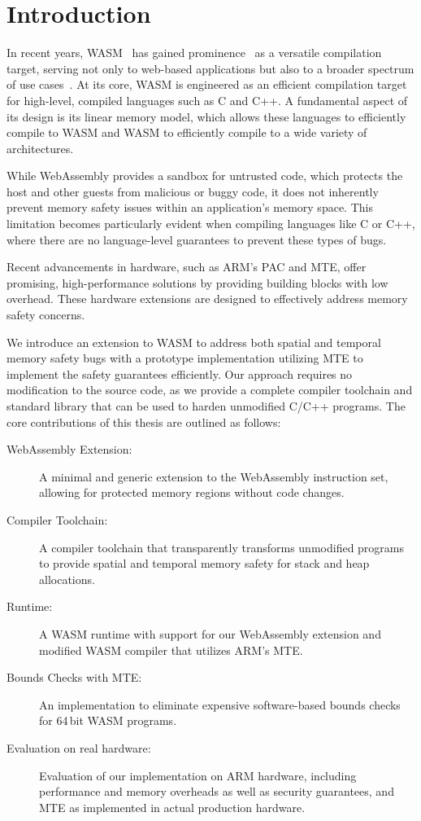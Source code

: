 \chapter{Introduction}
\label{ch:intro}

In recent years, \ac{WASM}~\cite{haas2017bringing} has gained prominence~\cite{musch2019new} as a versatile compilation target, serving not only to web-based applications but also to a broader spectrum of use cases~\cite{wasm_use_cases}.
At its core, \ac{WASM} is engineered as an efficient compilation target for high-level, compiled languages such as C and C++.
A fundamental aspect of its design is its linear memory model, which allows these languages to efficiently compile to \ac{WASM} and \ac{WASM} to efficiently compile to a wide variety of architectures.

While WebAssembly provides a sandbox for untrusted code, which protects the host and other guests from malicious or buggy code, it does not inherently prevent memory safety issues within an application's memory space.
This limitation becomes particularly evident when compiling languages like C or C++, where there are no language-level guarantees to prevent these types of bugs.

Recent advancements in hardware, such as ARM's \ac{PAC} and \acf{MTE}, offer promising, high-performance solutions by providing building blocks with low overhead.
These hardware extensions are designed to effectively address memory safety concerns.

We introduce an extension to \ac{WASM} to address both spatial and temporal memory safety bugs with a prototype implementation utilizing \ac{MTE} to implement the safety guarantees efficiently.
Our approach requires no modification to the source code, as we provide a complete compiler toolchain and standard library that can be used to harden unmodified C/C++ programs.
The core contributions of this thesis are outlined as follows:

\begin{description}
    \item[WebAssembly Extension:] A minimal and generic extension to the WebAssembly instruction set, allowing for protected memory regions without code changes.
    \item[Compiler Toolchain:] A compiler toolchain that transparently transforms unmodified programs to provide spatial and temporal memory safety for stack and heap allocations.
    \item[Runtime:] A \ac{WASM} runtime with support for our WebAssembly extension and modified \ac{WASM} compiler that utilizes ARM's \ac{MTE}.
    \item[Bounds Checks with \ac{MTE}:] An implementation to eliminate expensive software-based bounds checks for 64\,bit \ac{WASM} programs.
    \item[Evaluation on real hardware:] Evaluation of our implementation on ARM hardware, including performance and memory overheads as well as security guarantees, and \ac{MTE} as implemented in actual production hardware.
\end{description}
